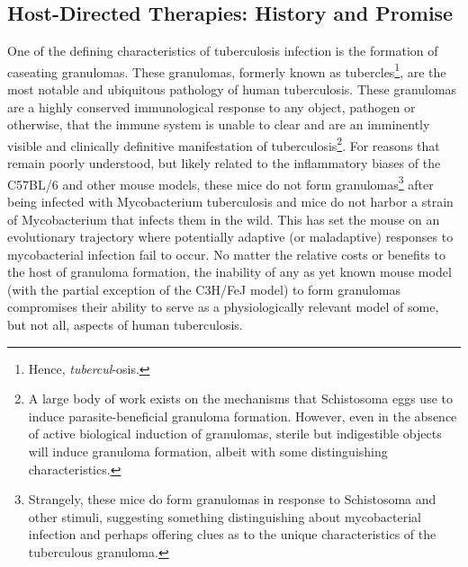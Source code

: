 \subsection{Host\hyp{}Directed Therapies: History and Promise}\label{hdt}

One of the defining characteristics of tuberculosis infection is the formation of caseating granulomas. These granulomas, formerly known as tubercles\footnote{Hence, \textit{tubercul}\hyp{}osis.}, are the most notable and ubiquitous pathology of human tuberculosis. These granulomas are a highly conserved immunological response to any object, pathogen or otherwise, that the immune system is unable to clear and are an imminently visible and clinically definitive manifestation of tuberculosis\footnote{A large body of work exists on the mechanisms that Schistosoma eggs use to induce parasite\hyp{}beneficial granuloma formation. However, even in the absence of active biological induction of granulomas, sterile but indigestible objects will induce granuloma formation, albeit with some distinguishing characteristics.}. For reasons that remain poorly understood, but likely related to the inflammatory biases of the C57BL/6 and other mouse models, these mice do not form granulomas\footnote{Strangely, these mice do form granulomas in response to Schistosoma and other stimuli, suggesting something distinguishing about mycobacterial infection and perhaps offering clues as to the unique characteristics of the tuberculous granuloma.} after being infected with Mycobacterium tuberculosis and mice do not harbor a strain of Mycobacterium that infects them in the wild. This has set the mouse on an evolutionary trajectory where potentially adaptive (or maladaptive) responses to mycobacterial infection fail to occur. No matter the relative costs or benefits to the host of granuloma formation, the inability of any as yet known mouse model (with the partial exception of the C3H/FeJ model) to form granulomas compromises their ability to serve as a physiologically relevant model of some, but not all, aspects of human tuberculosis.

